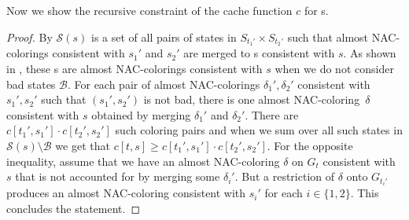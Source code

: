 Now we show the recursive constraint of the cache function \( c \) for \JoinNode{}s.
%
%
%
\begin{proof}
	By 
	\( \mathcal{S}(s) \) is a set of
	all pairs of states in \( S_{t_1'} \times S_{t_2'} \)
	such that almost NAC-colorings consistent with \( s_1' \) and \( s_2' \)
	are merged to \rbcol{}s consistent with \( s \).
	As shown in ,
	these \rbcol{}s are almost NAC-colorings consistent with \( s \)
	when we do not consider bad states \( \mathcal{B} \).
	For each pair of almost NAC-colorings \( \delta_1', \delta_2' \)
	consistent with \( s_1', s_2' \) such that \( (s_1', s_2') \) is not bad,
	there is one almost NAC-coloring~\( \delta \) consistent with \( s \)
	obtained by merging \( \delta_1' \) and \( \delta_2' \).
	There are \( c[t_1', s_1'] \cdot c[t_2', s_2'] \) such coloring pairs and
	when we sum over all such states in \( \mathcal{S}(s) \setminus \mathcal{B} \)
	we get that \( c[t, s] \ge c[t_1', s_1'] \cdot c[t_2', s_2'] \).
	For the opposite inequality, assume that we have
	an almost NAC-coloring \( \delta \) on \( G_t \) consistent with \( s \)
	that is not accounted for by merging some \( \delta_i' \).
	But a restriction of \( \delta \) onto \( G_{t_i'} \) produces an almost NAC-coloring
	consistent with \( s_i' \) for each \( i \in \{1,2\} \).
	This concludes the statement.
\end{proof}
%

